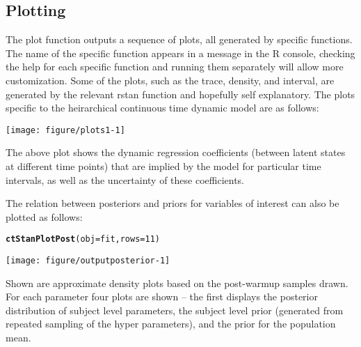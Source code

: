 \documentclass[nojss]{jss}\usepackage[]{graphicx}\usepackage[]{color}
\makeatletter
\def\maxwidth{ %
  \ifdim\Gin@nat@width>\linewidth
    \linewidth
  \else
    \Gin@nat@width
  \fi
}
\newcommand{\hlnum}[1]{\textcolor[rgb]{0.686,0.059,0.569}{#1}}%
\newcommand{\hlstd}[1]{\textcolor[rgb]{0.345,0.345,0.345}{#1}}%
\newcommand{\hlkwc}[1]{\textcolor[rgb]{0.333,0.667,0.333}{#1}}%
\newcommand{\hlkwd}[1]{\textcolor[rgb]{0.737,0.353,0.396}{\textbf{#1}}}%
\newenvironment{kframe}{%
 \def\at@end@of@kframe{}%
 \ifinner\ifhmode%
  \def\at@end@of@kframe{\end{minipage}}%
  \begin{minipage}{\columnwidth}%
 \fi\fi%
 \def\FrameCommand##1{\hskip\@totalleftmargin \hskip-\fboxsep
 \colorbox{shadecolor}{##1}\hskip-\fboxsep
     \hskip-\linewidth \hskip-\@totalleftmargin \hskip\columnwidth}%
 \MakeFramed {\advance\hsize-\width
   \@totalleftmargin\z@ \linewidth\hsize
   \@setminipage}}%
 {\par\unskip\endMakeFramed%
 \at@end@of@kframe}
\newenvironment{knitrout}{}{} %
\makeatother
\begin{document}
\subsection{Plotting}
The plot function outputs a sequence of plots, all generated by specific functions. The name of the specific function appears in a message in the R console, checking the help for each specific function and running them separately will allow more customization. Some of the plots, such as the trace, density, and interval, are generated by the relevant rstan function and hopefully self explanatory. The plots specific to the heirarchical continuous time dynamic model are as follows:

\begin{knitrout}\small
{}\color{fgcolor}

{\centering \texttt{[image: figure/plots1-1]} 

}



\end{knitrout}

The above plot shows the dynamic regression coefficients (between latent states at different time points) that are implied by the model for particular time intervals, as well as the uncertainty of these coefficients.

The relation between posteriors and priors for variables of interest can also be plotted as follows:

\begin{knitrout}\small
{}\color{fgcolor}\begin{kframe}
\begin{alltt}
\hlkwd{ctStanPlotPost}\hlstd{(}\hlkwc{obj} \hlstd{= fit,} \hlkwc{rows}\hlstd{=}\hlnum{11}\hlstd{)}
\end{alltt}
\end{kframe}

{\centering \texttt{[image: figure/outputposterior-1]} 

}



\end{knitrout}

Shown are approximate density plots based on the post-warmup samples drawn. For each parameter four plots are shown -- the first displays the posterior distribution of subject level parameters, the subject level prior (generated from repeated sampling of the hyper parameters), and the prior for the population mean.
\end{document}
